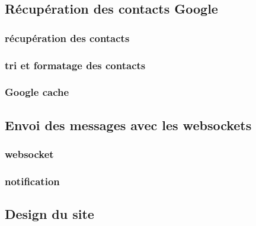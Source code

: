 \subsection{Récupération des contacts Google}



\subsubsection{récupération des contacts}

\subsubsection{tri et formatage des contacts}

\subsubsection{Google cache}



\subsection{Envoi des messages avec les websockets}



\subsubsection{websocket}

\subsubsection{notification}



\subsection{Design du site}

